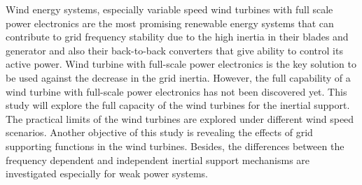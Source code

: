 Wind energy systems, especially variable speed wind turbines with full scale power electronics are the most promising renewable energy systems that can contribute to grid frequency stability due to the high inertia in their blades and generator and also their back-to-back converters that give ability to control its active power. Wind turbine with full-scale power electronics is the key solution to be used against the decrease in the grid inertia. However, the full capability of a wind turbine with full-scale power electronics has not been discovered yet. This study will explore the full capacity of the wind turbines for the inertial support. The practical limits of the wind turbines are explored under different wind speed scenarios. Another objective of this study is revealing the effects of grid supporting functions in the wind turbines. Besides, the differences between the frequency dependent and independent inertial support mechanisms are investigated especially for weak power systems.\newpage
